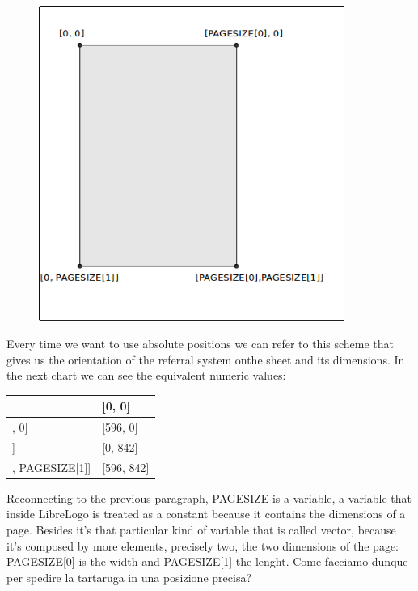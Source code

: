 \vskip 1cm

\begin{figure}[H]
   \centering
   \includegraphics[width=10.0cm,trim=8 8 8 8,clip]{./images/disegnare/disegnare-30.png}
   \label{dis-30}
\end{figure}

\vskip 1cm

Every time we want to use absolute positions we can refer to this scheme that gives us the orientation of the referral system onthe sheet and its dimensions. In the next chart we can see the equivalent numeric values:

\begin{center}
\begin{tabular}{| l | l |}
\hline
[0, 0] & [0, 0] \\ \hline
[PAGESIZE[0], 0]  & [596, 0] \\ \hline 
[0, PAGESIZE[1]]  &     [0, 842]   \\ \hline 
[PAGESIZE[0], PAGESIZE[1]]  & [596, 842]   \\ \hline 
\end{tabular}
\end{center}

Reconnecting to the previous paragraph, PAGESIZE is a variable, a variable that inside LibreLogo is treated as a constant because it contains the dimensions of a page. Besides it's that particular kind of variable that is called vector, because it's composed by more elements, precisely two, the two dimensions of the page: PAGESIZE[0] is the width and PAGESIZE[1] the lenght.
Come facciamo dunque per spedire la tartaruga in una posizione precisa?

